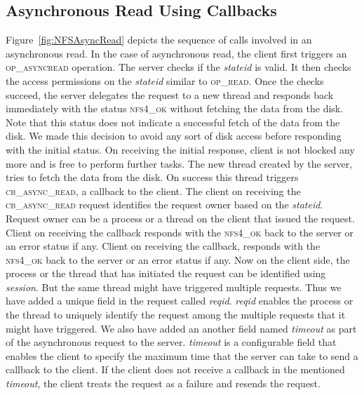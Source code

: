 \subsection{Asynchronous Read Using Callbacks}
Figure~\ref{fig:NFSAsyncRead} depicts the sequence of calls involved in an asynchronous read. In the case of asynchronous read, the client first triggers an \textsc{op\_asyncread} operation. The server checks if the \textit{stateid} is valid. It then checks the access permissions on the \textit{stateid} similar to \textsc{op\_read}. Once the checks succeed, the server delegates the request to a new thread and responds back immediately with the status \textsc{nfs4\_ok} without fetching the data from the disk.  Note that this status does not indicate a successful fetch of the data from the disk. We made this decision to avoid any sort of disk access before responding with the initial status. On receiving the initial response, client is not blocked any more and is free to perform further tasks. The new thread created by the server, tries to fetch the data from the disk. On success this thread triggers  \textsc{cb\_async\_read}, a callback to the client. The client on receiving the \textsc{cb\_async\_read} request identifies the request owner based on the \textit{stateid}. Request owner can  be a process or a thread on the client that issued the request. Client on receiving the callback responds with the \textsc{nfs4\_ok} back to the server or an error status if any.  Client on receiving the callback, responds with the \textsc{nfs4\_ok} back to the server or an error status if any. Now on the client side, the process or the thread that has initiated the request can be identified using \textit{session}. But the same thread might have triggered multiple requests. Thus we have added a unique field in the request called \textit{reqid}.  \textit{reqid} enables the process or the thread to uniquely identify the request among the multiple requests that it might have triggered. We also have added an another field named  \textit{timeout} as part of  the asynchronous request to the server. \textit{timeout} is a configurable field that enables the client to specify the maximum time that the server can take to send a callback to the client. If the client does not receive a callback in the mentioned  \textit{timeout}, the client treats the request as a failure and resends the request.

